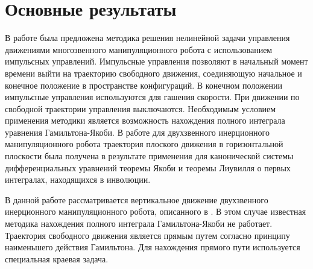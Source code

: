 \section{Основные результаты} %

В работе \cite{ul1} была предложена методика решения нелинейной задачи управления движениями многозвенного манипуляционного робота с использованием импульсных управлений. Импульсные управления позволяют в начальный момент времени выйти на траекторию свободного движения, соединяющую начальное и конечное положение в пространстве конфигураций. В конечном положении импульсные управления используются для гашения скорости. При движении по свободной траектории управления выключаются. Необходимым условием применения методики является возможность нахождения полного интеграла уравнения Гамильтона-Якоби. В работе \cite{b2} для двухзвенного инерционного манипуляционного робота траектория плоского движения в горизонтальной плоскости была получена в результате применения для канонической системы дифференциальных уравнений теоремы Якоби и теоремы Лиувилля о первых интегралах, находящихся в инволюции.

В данной работе рассматривается вертикальное движение двухзвенного инерционного манипуляционного робота, описанного в \cite{b2}. В этом случае известная методика нахождения полного интеграла Гамильтона-Якоби не работает. Траектория свободного движения является прямым путем согласно принципу наименьшего действия Гамильтона. Для нахождения прямого пути используется специальная краевая задача.

